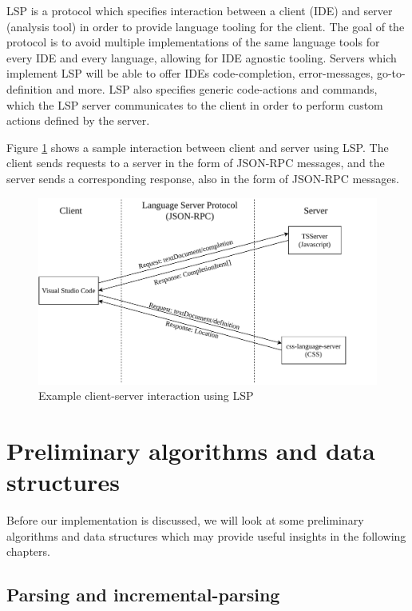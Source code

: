 LSP is a protocol which specifies interaction between a client (IDE) and server (analysis
tool) in order to provide language tooling for the client. The goal of the protocol is to
avoid multiple implementations of the same language tools for every IDE and every
language, allowing for IDE agnostic tooling. Servers which implement LSP will be able to
offer IDEs code-completion, error-messages, go-to-definition and more. LSP also specifies
generic code-actions and commands, which the LSP server communicates to the client in
order to perform custom actions defined by the server.

Figure \ref{fig:lspcommunication} shows a sample interaction between client and server
using LSP. The client sends requests to a server in the form of JSON-RPC messages, and the
server sends a corresponding response, also in the form of JSON-RPC messages.

\begin{figure}[t]
	\includegraphics[width=\textwidth]{figures/lspcommunication.drawio.pdf}
	\caption{Example client-server interaction using LSP}
	\label{fig:lspcommunication}
\end{figure}

\section{Preliminary algorithms and data structures}
\label{prelimalgos}

Before our implementation is discussed, we will look at some preliminary algorithms and
data structures which may provide useful insights in the following chapters.

\subsection*{Parsing and incremental-parsing}

